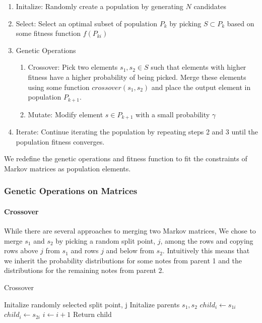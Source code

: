 \documentclass{article}
\begin{document}
\begin{enumerate}
\item Initalize: Randomly create a population by generating $N$ candidates
\item Select: Select an optimal subset of population $P_k$ by picking $S \subset P_k$ based on some fitness function $f(P_{ki})$
\item Genetic Operations
  \begin{enumerate}
  \item Crossover: Pick two elements $s_1, s_2 \in S$ such that elements with higher fitness have a higher probability of being picked. Merge these elements using some function $crossover(s_1, s_2)$ and place the output element in population $P_{k + 1}$.
  \item Mutate: Modify element $s \in P_{k + 1}$ with a small probability $\gamma$
  \end{enumerate}
\item Iterate: Continue iterating the population by repeating steps 2 and 3 until the population fitness converges.
\end{enumerate}

We redefine the genetic operations and fitness function to fit the constraints of Markov matrices as population elements.

\subsubsection{Genetic Operations on Matrices}

\paragraph{Crossover} While there are several approaches to merging two Markov matrices, We chose to merge $s_1$ and $s_2$ by picking a random split point, $j$, among the rows and copying rows above $j$ from $s_1$ and rows $j$ and below from $s_2$. Intuitively this means that we inherit the probability distributions for some notes from parent 1 and the distributions for the remaining notes from parent 2.

\begin{algorithm}[H]
  \caption{Crossover}
  \begin{algorithmic}
    \State Initalize randomly selected split point, j
    \State Initalize parents $s_1, s_2$
    \State $child_i \gets s_{1i}$
    \EndIf
    \State $child_i \gets s_{2i}$
    \EndIf
    \State $i \gets i + 1$
    \EndWhile
    \State Return child  
  \end{algorithmic}
\end{algorithm}
\end{document}
